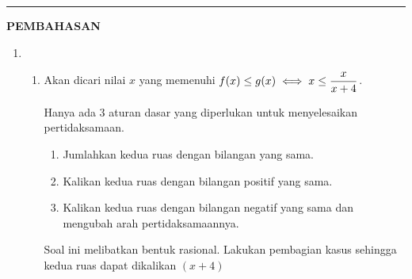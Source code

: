 \vspace{0.2cm}\hrule height 1pt\vspace{0.5cm}


\begin{center}
\textbf{\large{PEMBAHASAN}}
\end{center}
\begin{enumerate}[leftmargin=*, label={\arabic*}.]
\item
    \begin{enumerate}[label={\alph*}.]
    \item Akan dicari nilai $x$ yang memenuhi
    $\displaystyle f(x) \leq g(x) \iff x \leq \frac{x}{x+4}$.

    \vspace{0.1cm}
    Hanya ada 3 aturan dasar yang diperlukan untuk menyelesaikan pertidaksamaan.
        \begin{enumerate}[label={\arabic*})]
        \item Jumlahkan kedua ruas dengan bilangan yang sama.
        \item Kalikan kedua ruas dengan bilangan positif yang sama.
        \item Kalikan kedua ruas dengan bilangan negatif yang sama dan 
        mengubah arah pertidaksamaannya.
        \end{enumerate}
    Soal ini melibatkan bentuk rasional. Lakukan pembagian kasus sehingga kedua
    ruas dapat dikalikan $(x+4)$
        

\end{enumerate}
\end{enumerate}
